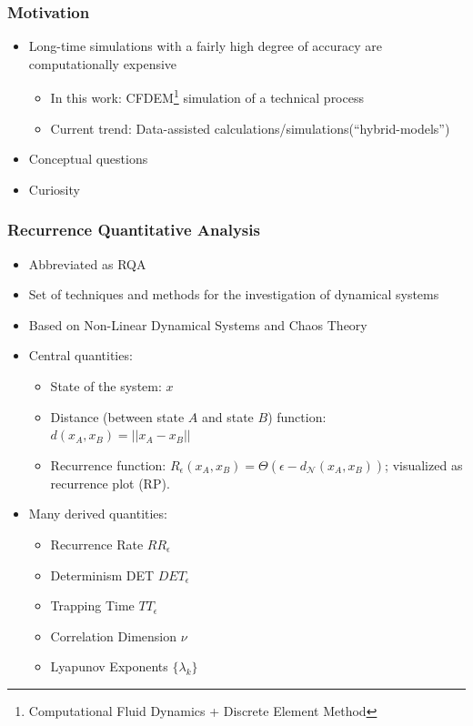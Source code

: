 \documentclass[9pt, english]{beamer}
\begin{document}
\begin{frame}
\frametitle{Motivation}
\begin{itemize}
 \item Long-time simulations with a fairly high degree of accuracy are computationally expensive
 \begin{itemize}
 \item In this work: CFDEM\footnote{Computational Fluid Dynamics + Discrete Element Method} simulation of a technical process
 \item Current trend: Data-assisted calculations/simulations(``hybrid-models'')
 \end{itemize}
 \item Conceptual questions 
 \item Curiosity
\end{itemize}
\end{frame}

\begin{frame}
\frametitle{Recurrence Quantitative Analysis}
\begin{itemize}
 \item Abbreviated as RQA
 \item Set of techniques and methods for the investigation of dynamical systems
 \item Based on Non-Linear Dynamical Systems and Chaos Theory
 \item Central quantities:
 \begin{itemize}
  \item State of the system: \(x\)
  \item Distance (between state \(A\) and state \(B\)) function: \(d(x_A,x_B) = \lvert \lvert x_A - x_B \rvert \rvert\)
  \item Recurrence function: \(R_{\epsilon}(x_A,x_B) = \Theta(\epsilon - d_{\mathcal{N}}(x_A,x_B))\); visualized as recurrence plot (RP).
 \end{itemize}
 \item Many derived quantities:
 \begin{itemize}
  \item Recurrence Rate \(RR_{\epsilon}\)
  \item Determinism DET \(DET_{\epsilon}\)
  \item Trapping Time \(TT_{\epsilon}\)
  \item Correlation Dimension \(\nu\)
  \item Lyapunov Exponents \(\{\lambda_k\}\)
 \end{itemize}
\end{itemize}
\end{frame}
\end{document}
